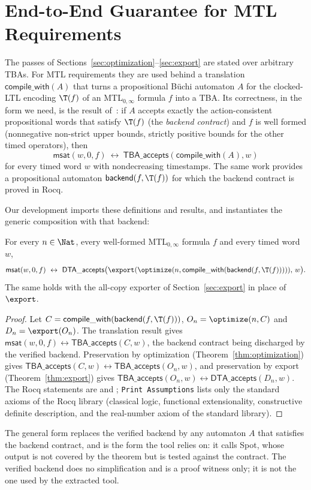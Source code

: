 \section{End-to-End Guarantee for MTL Requirements}
\label{sec:composition}
The passes of Sections~\ref{sec:optimization}--\ref{sec:export} are stated over arbitrary TBAs. For MTL requirements they are used behind a translation $\mathsf{compile\_with}(A)$ that turns a propositional B\"uchi automaton $A$ for the clocked-LTL encoding $\T(f)$ of an MTL$_{0,\infty}$ formula $f$ into a TBA. Its correctness, in the form we need, is the result of~\cite{faresmtl}: if $A$ accepts exactly the action-consistent propositional words that satisfy $\T(f)$ (the \emph{backend contract}) and $f$ is well formed (nonnegative non-strict upper bounds, strictly positive bounds for the other timed operators), then
\[
\mathsf{msat}(w,0,f)\ \leftrightarrow\ \mathsf{TBA\_accepts}(\mathsf{compile\_with}(A),w)
\]
for every timed word $w$ with nondecreasing timestamps. The same work provides a propositional automaton $\mathsf{backend}(f,\T(f))$ for which the backend contract is proved in Rocq.

Our development imports these definitions and results, and instantiates the generic composition with that backend:
\begin{theorem}
\label{thm:composition}
For every $n\in\Nat$, every well-formed MTL$_{0,\infty}$ formula $f$ and every timed word $w$,
\[
  \mathsf{msat}(w,0,f)\ \leftrightarrow\
  \mathsf{DTA\_accepts}\bigl(\export(\optimize(n,\mathsf{compile\_with}(\mathsf{backend}(f,\T(f))))),\,w\bigr).
\]
The same holds with the all-copy exporter of Section~\ref{sec:export} in place of $\export$.
\end{theorem}
\begin{proof}
Let $C=\mathsf{compile\_with}(\mathsf{backend}(f,\T(f)))$, $O_n=\optimize(n,C)$ and $D_n=\export(O_n)$. The translation result gives $\mathsf{msat}(w,0,f)\leftrightarrow\mathsf{TBA\_accepts}(C,w)$, the backend contract being discharged by the verified backend. Preservation by optimization (Theorem~\ref{thm:optimization}) gives $\mathsf{TBA\_accepts}(C,w)\leftrightarrow\mathsf{TBA\_accepts}(O_n,w)$, and preservation by export (Theorem~\ref{thm:export}) gives $\mathsf{TBA\_accepts}(O_n,w)\leftrightarrow\mathsf{DTA\_accepts}(D_n,w)$. The Rocq statements are  and ; \texttt{Print Assumptions} lists only the standard axioms of the Rocq library (classical logic, functional extensionality, constructive definite description, and the real-number axiom of the standard library).
\end{proof}
The general form  replaces the verified backend by any automaton $A$ that satisfies the backend contract, and is the form the tool relies on: it calls Spot, whose output is not covered by the theorem but is tested against the contract. The verified backend does no simplification and is a proof witness only; it is not the one used by the extracted tool.

